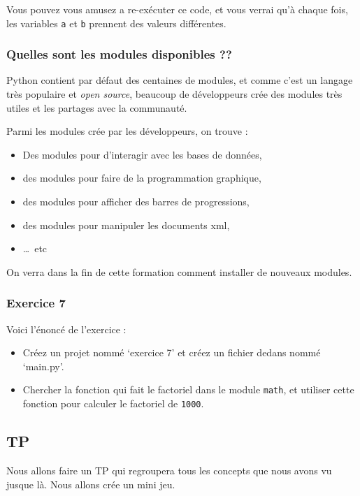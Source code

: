 \documentclass[12pt]{article}
\newcommand{\code}[1]{\colorbox{light-gray}{\texttt{#1}}}
\begin{document}
            Vous pouvez vous amusez a re-exécuter ce code, et vous verrai qu'à chaque fois, les variables \code{a} et
            \code{b} prennent des valeurs différentes.

        \subsubsection{Quelles sont les modules disponibles ??}
            Python contient par défaut des centaines de modules, et comme c'est un langage très populaire et
            \emph{open source}, beaucoup de développeurs crée des modules très utiles et les partages avec la communauté.

            Parmi les modules crée par les développeurs, on trouve :
            \begin{itemize}
                \item Des modules pour d’interagir avec les bases de données,
                \item des modules pour faire de la programmation graphique,
                \item des modules pour afficher des barres de progressions,
                \item des modules pour manipuler les documents xml,
                \item \dots\ etc
            \end{itemize}

            On verra dans la fin de cette formation comment installer de nouveaux modules.

        \subsubsection{Exercice 7}
            Voici l'énoncé de l'exercice :
            \begin{itemize}
                \item Créez un projet nommé `exercice 7' et créez un fichier dedans nommé `main.py'.
                \item Chercher la fonction qui fait le factoriel dans le module \code{math}, et utiliser cette fonction
                    pour calculer le factoriel de \code{1000}.
            \end{itemize}
    \subsection{TP}
        Nous allons faire un TP qui regroupera tous les concepts que nous avons vu jusque là. Nous allons crée un
        mini jeu.
\end{document}
